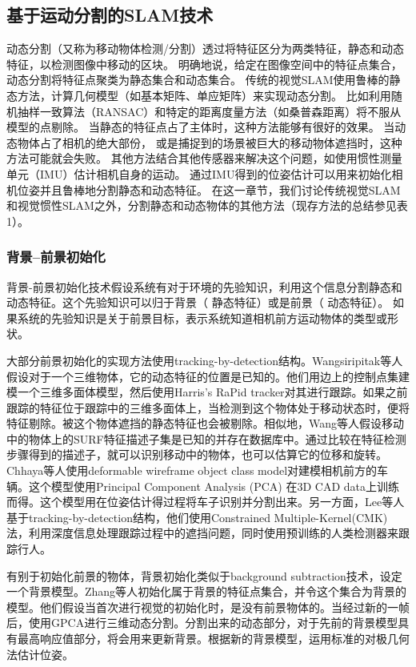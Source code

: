 \subsection{基于运动分割的SLAM技术}
\label{subsec:motion_segmentation}
\newpage
动态分割（又称为移动物体检测/分割\cite{Derome15UnmannedSyst, Klappstein09, Kundu09}）透过将特征区分为两类特征，静态和动态特征，以检测图像中移动的区块。
明确地说，给定在图像空间中的特征点集合，动态分割将特征点聚类为静态集合和动态集合。
传统的视觉SLAM使用鲁棒的静态方法，计算几何模型（如基本矩阵、单应矩阵）来实现动态分割。
比如利用随机抽样一致算法（RANSAC）\cite{37}和特定的距离度量方法（如桑普森距离\cite{59}）将不服从模型的点剔除。
当静态的特征点占了主体时，这种方法能够有很好的效果。
当动态物体占了相机的绝大部份， 或是捕捉到的场景被巨大的移动物体遮挡时，这种方法可能就会失败。
其他方法结合其他传感器来解决这个问题，如使用惯性测量单元（IMU）估计相机自身的运动\cite{67, 92}。
通过IMU得到的位姿估计可以用来初始化相机位姿并且鲁棒地分割静态和动态特征。
在这一章节，我们讨论传统视觉SLAM和视觉惯性SLAM之外，分割静态和动态物体的其他方法（现存方法的总结参见表1）。

\subsubsection{背景--前景初始化}
背景-前景初始化技术假设系统有对于环境的先验知识，利用这个信息分割静态和动态特征。这个先验知识可以归于背景（ 静态特征）或是前景（ 动态特征）。
如果系统的先验知识是关于前景目标，表示系统知道相机前方运动物体的类型或形状。

大部分前景初始化的实现方法使用tracking-by-detection结构\cite{14, 89}。Wangsiripitak等人\cite{173}假设对于一个三维物体，它的动态特征的位置是已知的。他们用边上的控制点集建模一个三维多面体模型，然后使用Harris’s RaPid tracker\cite{56}对其进行跟踪。如果之前跟踪的特征位于跟踪中的三维多面体上，当检测到这个物体处于移动状态时，便将特征剔除。被这个物体遮挡的静态特征也会被剔除。相似地，Wang等人\cite{172}假设移动中的物体上的SURF特征描述子集是已知的并存在数据库中。通过比较在特征检测步骤得到的描述子，就可以识别移动中的物体，也可以估算它的位移和旋转。Chhaya等人\cite{21}使用deformable wireframe object class model对建模相机前方的车辆。这个模型使用Principal Component Analysis (PCA) 在3D CAD data上训练而得。这个模型用在位姿估计得过程将车子识别并分割出来。另一方面，Lee等人\cite{89, 90}基于tracking-by-detection结构，他们使用Constrained Multiple-Kernel(CMK)法，利用深度信息处理跟踪过程中的遮挡问题，同时使用预训练的人类检测器来跟踪行人。

有别于初始化前景的物体，背景初始化类似于background subtraction技术，设定一个背景模型\cite{7,126}。Zhang等人\cite{184}初始化属于背景的特征点集合，并令这个集合为背景的模型。他们假设当首次进行视觉的初始化时，是没有前景物体的。当经过新的一帧后，使用GPCA\cite{165}进行三维动态分割。分割出来的动态部分，对于先前的背景模型具有最高响应值部分，将会用来更新背景。根据新的背景模型，运用标准的对极几何法估计位姿。

